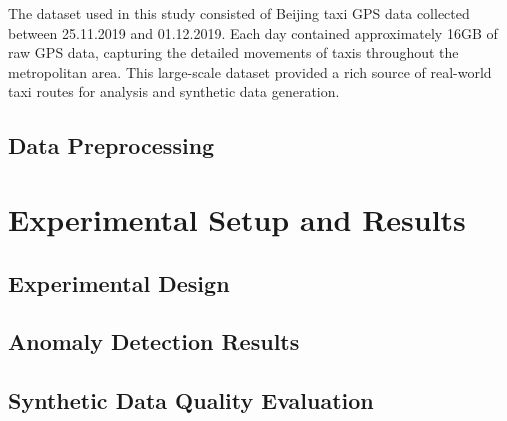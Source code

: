 \documentclass[runningheads]{llncs}
\begin{document}
The dataset used in this study consisted of Beijing taxi GPS data collected between 25.11.2019 and 01.12.2019. Each day contained approximately 16GB of raw GPS data, capturing the detailed movements of taxis throughout the metropolitan area. This large-scale dataset provided a rich source of real-world taxi routes for analysis and synthetic data generation.

\subsection{Data Preprocessing}
\label{sec:preprocessing}

\begin{compactoutline}
\end{compactoutline}

\section{Experimental Setup and Results}
\label{sec:evaluation}

\subsection{Experimental Design}
\label{sec:exp-design}

\begin{compactoutline}
\end{compactoutline}

\subsection{Anomaly Detection Results}
\label{sec:results}


\subsection{Synthetic Data Quality Evaluation}
\label{sec:synthetic-eval}
\end{document}
